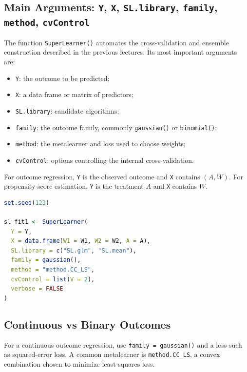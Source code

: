 \label{lec:6-4}

\subsection{Main Arguments: \texttt{Y}, \texttt{X}, \texttt{SL.library}, \texttt{family}, \texttt{method}, \texttt{cvControl}}

The function \texttt{SuperLearner()} automates the cross-validation and ensemble
construction described in the previous lectures. Its most important arguments are:
\begin{itemize}
\item \texttt{Y}: the outcome to be predicted;
\item \texttt{X}: a data frame or matrix of predictors;
\item \texttt{SL.library}: candidate algorithms;
\item \texttt{family}: the outcome family, commonly \texttt{gaussian()} or
\texttt{binomial()};
\item \texttt{method}: the metalearner and loss used to choose weights;
\item \texttt{cvControl}: options controlling the internal cross-validation.
\end{itemize}

For outcome regression, \texttt{Y} is the observed outcome and \texttt{X} contains
$(A,W)$. For propensity score estimation, \texttt{Y} is the treatment $A$ and
\texttt{X} contains $W$.

\begin{implementationbox}
\begin{lstlisting}[language=R]
set.seed(123)

sl_fit1 <- SuperLearner(
  Y = Y,
  X = data.frame(W1 = W1, W2 = W2, A = A),
  SL.library = c("SL.glm", "SL.mean"),
  family = gaussian(),
  method = "method.CC_LS",
  cvControl = list(V = 2),
  verbose = FALSE
)
\end{lstlisting}
\end{implementationbox}

\subsection{Continuous vs Binary Outcomes}

For a continuous outcome regression, use \texttt{family = gaussian()} and a loss such
as squared-error loss. A common metalearner is \texttt{method.CC\_LS}, a convex
combination chosen to minimize least-squares loss.

